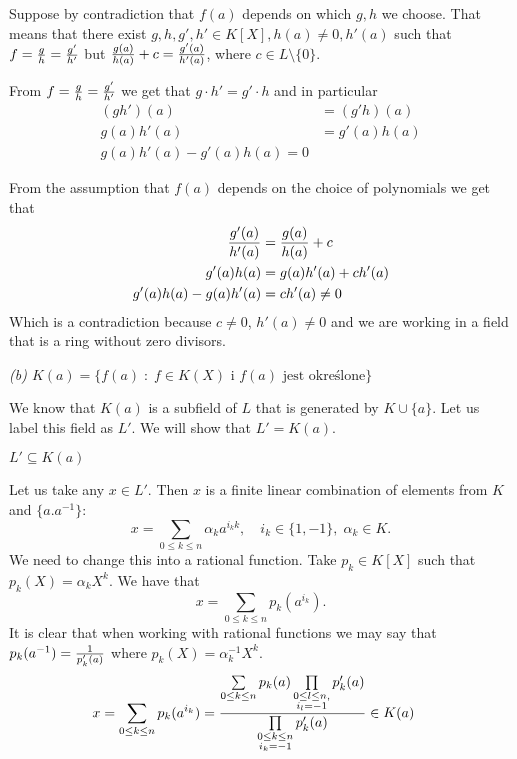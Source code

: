 \documentclass{article}
\begin{document}



Suppose by contradiction that $f(a)$ depends on which $g,h$ we choose. That means that there exist $g,h, g',h'\in K[X], h(a)\neq 0, h'(a)$ such that $f={g\over h}={g'\over h'}$ but ${g(a)\over h(a)}+c= {g'(a)\over h'(a)}$, where $c\in L\setminus\{0\}$. 

From $f={g\over h}={g'\over h'}$ we get that $g\cdot h'=g'\cdot h$ and in particular
\begin{align*}
    (gh')(a)&=(g'h)(a)\\
    g(a)h'(a)&=g'(a)h(a)\\
    g(a)h'(a)-g'(a)h(a)=0
\end{align*}

From the assumption that $f(a)$ depends on the choice of polynomials we get that 
\begin{align*}
    {g'(a)\over h'(a)}&={g(a)\over h(a)}+c\\
    g'(a)h(a)&=g(a)h'(a)+ch'(a)\\
    g'(a)h(a)-g(a)h'(a)&=ch'(a)\neq 0
\end{align*}
Which is a contradiction because $c\neq 0$, $h'(a)\neq 0$ and we are working in a field that is a ring without zero divisors.
\smallskip


\emph{\color{pink}(b) $K(a)=\{f(a)\;:\;f\in K(X)\text{ i }f(a)\text{ jest określone}\}$}

We know that $K(a)$ is a subfield of $L$ that is generated by $K\cup\{a\}$. Let us label this field as $L'$. We will show that $L'=K(a)$.

$L'\subseteq K(a)$

Let us take any $x\in L'$. Then $x$ is a finite linear combination of elements from $K$ and $\{a. a^{-1}\}$:
$$x=\sum\limits_{0\leq k\leq n}\alpha_k a^{i_kk},\quad i_k\in\{1,-1\},\;\alpha_k\in K.$$
We need to change this into a rational function. Take $p_k\in K[X]$ such that $p_k(X)=\alpha_kX^k$. We have that
$$x=\sum\limits_{0\leq k\leq n}p_k(a^{i_k}).$$
It is clear that when working with rational functions we may say that $p_k(a^{-1})={1\over p_k'(a)}$ where $p_k(X)=\alpha_k^{-1}X^k$.
\begin{align*}
    x&=\sum\limits_{0\leq k\leq n}p_k(a^{i_k})={\sum\limits_{0\leq k\leq n}p_k(a)\prod\limits_{\substack{0\leq l\leq n,\\ i_l=-1}}p_k'(a)\over\prod\limits_{\substack{0\leq k\leq n\\i_k=-1}}p_k'(a)}\in K(a)
\end{align*}
\end{document}
